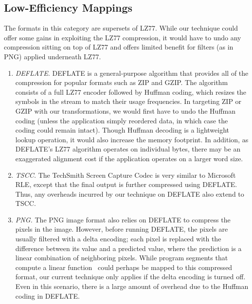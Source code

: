 \subsection*{Low-Efficiency Mappings}
\label{sec:formats-bad}

The formats in this category are supersets of LZ77.  While our
technique could offer some gains in exploiting the LZ77 compression,
it would have to undo any compression sitting on top of LZ77 and
offers limited benefit for filters (as in PNG) applied underneath
LZ77.

\begin{enumerate}

\item {\it DEFLATE.}  DEFLATE is a general-purpose algorithm that
  provides all of the compression for popular formats such as ZIP and
  GZIP.  The algorithm consists of a full LZ77 encoder followed by
  Huffman coding, which resizes the symbols in the stream to match
  their usage frequencies.  In targeting ZIP or GZIP with our
  transformations, we would first have to undo the Huffman coding
  (unless the application simply reordered data, in which case the
  coding could remain intact).  Though Huffman decoding is a
  lightweight lookup operation, it would also increase the memory
  footprint.  In addition, as DEFLATE's LZ77 algorithm operates on
  individual bytes, there may be an exaggerated alignment cost if the
  application operates on a larger word size.

\item {\it TSCC.}  The TechSmith Screen Capture Codec is very similar
  to Microsoft RLE, except that the final output is further compressed
  using DEFLATE.  Thus, any overheads incurred by our technique on
  DEFLATE also extend to TSCC.

\item {\it PNG.}  The PNG image format also relies on DEFLATE to
  compress the pixels in the image.  However, before running DEFLATE,
  the pixels are usually filtered with a delta encoding; each pixel is
  replaced with the difference between its value and a predicted
  value, where the prediction is a linear combination of neighboring
  pixels.  While program segments that compute a linear
  function~\cite{aalamb} could perhaps be mapped to this compressed
  format, our current technique only applies if the delta encoding is
  turned off.  Even in this scenario, there is a large amount of
  overhead due to the Huffman coding in DEFLATE.

\end{enumerate}

